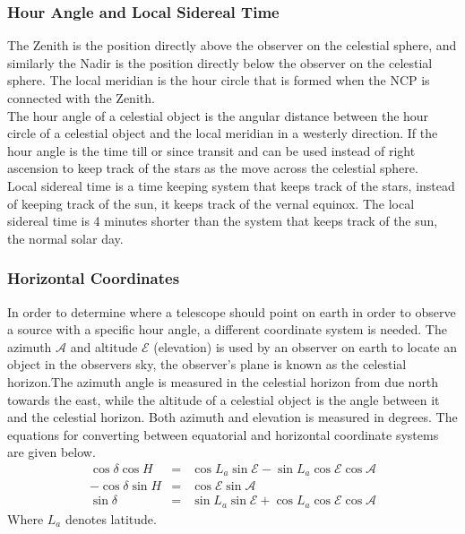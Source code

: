 \subsubsection{Hour Angle and Local Sidereal Time}
The Zenith is the position directly above the observer on the celestial sphere, and similarly the Nadir is the position directly below the observer on the celestial sphere. The local meridian is the hour circle that is formed when the NCP is connected with the Zenith. \\ 
The hour angle of a celestial object is the angular distance between the hour circle of a celestial object and the local meridian in a westerly direction. If the hour angle is the time till or since transit and can be used instead of right ascension to keep track of the stars as the move across the celestial sphere. \\
Local sidereal time is a time keeping system that keeps track of the stars, instead of keeping track of the sun, it keeps track of the vernal equinox. The local sidereal time is 4 minutes shorter than the system that keeps track of the sun, the normal solar day.
\subsubsection{Horizontal Coordinates}
In order to determine where a telescope should point on earth in order to observe a source with a specific hour angle, a different coordinate system is needed. The azimuth $\mathcal{A}$ and altitude $\mathcal{E}$ (elevation) is used by an observer on earth to locate an object in the observers sky, the observer's plane is known as the celestial horizon.The azimuth angle is measured in the celestial horizon from due north towards the east, while the altitude of a celestial object is the angle between it and the celestial horizon. Both azimuth and elevation is measured in degrees. The equations for converting between equatorial and horizontal coordinate systems are given below. \begin{eqnarray}
\cos\delta\cos H &=& \cos L_a\sin \mathcal{E} - \sin L_a\cos \mathcal{E}\cos \mathcal{A}\\
-\cos\delta\sin H&=& \cos \mathcal{E}\sin \mathcal{A}\\
\sin\delta &=& \sin L_a\sin \mathcal{E}+\cos L_a \cos \mathcal{E} \cos \mathcal{A} 
\end{eqnarray}
Where $L_a$ denotes latitude.
